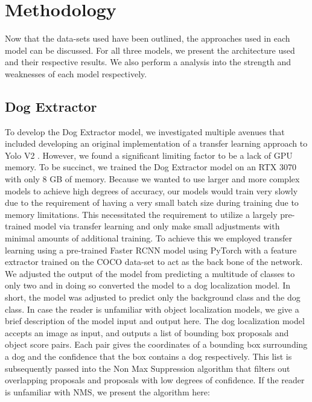 \documentclass{article}
\begin{document}
\section{Methodology}
Now that the data-sets used have been outlined, the approaches used in each model can be discussed.  For all three models, we present the architecture used and their respective results.  We also perform a analysis into the strength and weaknesses of each model respectively.  

\subsection{Dog Extractor}

To develop the Dog Extractor model, we investigated multiple avenues that included developing an original implementation of a transfer learning approach to Yolo V2 \cite{RedmonJoseph2016YBFS}.  However, we found a significant limiting factor to be a lack of GPU memory.  To be succinct, we trained the Dog Extractor model on an RTX 3070 with only 8 GB of memory.  Because we wanted to use larger and more complex models to achieve high degrees of accuracy, our models would train very slowly due to the requirement of having a very small batch size during training due to memory limitations.  This necessitated the requirement to utilize a largely pre-trained model via transfer learning and only make small adjustments with minimal amounts of additional training.  To achieve this we employed transfer learning using a pre-trained Faster RCNN \cite{DBLP:journals/corr/RenHG015} model using PyTorch with a feature extractor trained on the COCO data-set \cite{coco} to act as the back bone of the network.  We adjusted the output of the model from predicting a multitude of classes to only two and in doing so converted the model to a dog localization model.  In short, the model was adjusted to predict only the background class and the dog class.  In case the reader is unfamiliar with object localization models, we give a brief description of the model input and output here.  The dog localization model accepts an image as input, and outputs a list of bounding box proposals and object score pairs.  Each pair gives the coordinates of a bounding box surrounding a dog and the confidence that the box contains a dog respectively.  This list is subsequently passed into the Non Max Suppression algorithm \cite{nms} that filters out overlapping proposals and proposals with low degrees of confidence.  If the reader is unfamiliar with NMS, we present the algorithm here: \\
\end{document}
